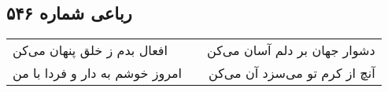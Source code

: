 \begin{center}
\section*{رباعی شماره ۵۴۶}
\label{sec:sh546}
\begin{longtable}{l p{0.5cm} r}
افعال بدم ز خلق پنهان می‌کن
&&
دشوار جهان بر دلم آسان می‌کن
\\
امروز خوشم به دار و فردا با من
&&
آنچ از کرم تو می‌سزد آن می‌کن
\\
\end{longtable}
\end{center}

